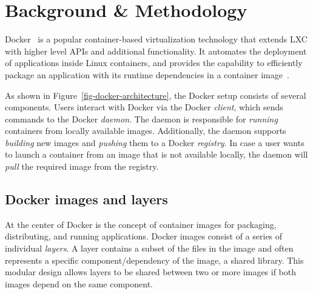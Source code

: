 \section{Background \& Methodology}
\label{sec:background}



Docker~\cite{docker} is a popular container-based virtualization technology
that extends LXC with higher level APIs and additional functionality.
%
It automates the deployment of applications inside Linux containers, and
provides the capability to efficiently package an application with its runtime
dependencies in a container image~\cite{slacker}.



As shown in Figure~\ref{fig-docker-architecture}, the Docker setup consists of
several components.
%
Users interact with Docker via the Docker \emph{client}, which sends commands
to the Docker \emph{daemon}.
%
The daemon is responsible for \emph{running} containers from locally available
images.
%
Additionally, the daemon supports \emph{building} new images and \emph{pushing}
them to a Docker \emph{registry}.
%
In case a user wants to launch a container from an image that is not available
locally, the daemon will \emph{pull} the required image from the registry.

\subsection{Docker images and layers}
\label{sec-image-layers}

At the center of Docker is the concept of container images for packaging,
distributing, and running applications.
%
Docker images consist of a series of individual \emph{layers}.
%
A layer contains a subset of the files in the image and often represents a
specific component/dependency of the image, \eg a shared library.
%
This modular design allows layers to be shared between two or more images if
both images depend on the same component.

